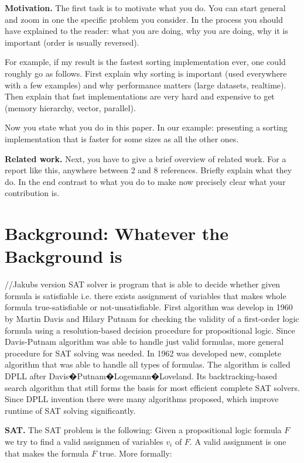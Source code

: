 \documentclass[letterpaper]{article}
\newcommand{\mypar}[1]{{\bf #1.}}
\begin{document}
\mypar{Motivation} The first task is to motivate what you do.  You can
start general and zoom in one the specific problem you consider.  In
the process you should have explained to the reader: what you are doing,
why you are doing, why it is important (order is usually reversed).

For example, if my result is the fastest sorting implementation ever, one
could roughly go as follows. First explain why sorting is important
(used everywhere with a few examples) and why performance matters (large datasets,
realtime). Then explain that fast implementations are very hard and
expensive to get (memory hierarchy, vector, parallel). 

Now you state what you do in this paper. In our example: 
presenting a sorting implementation that is
faster for some sizes as all the other ones.

\mypar{Related work} Next, you have to give a brief overview of
related work. For a report like this, anywhere between 2 and 8
references. Briefly explain what they do. In the end contrast to what
you do to make now precisely clear what your contribution is.

\section{Background: Whatever the Background is}\label{sec:background}

//Jakubs version
SAT solver is program that is able to decide whether given formula is satisfiable i.e. there exists assignment of variables that makes whole formula true-satisfiable or not-unsatisfiable.
First algorithm was develop in 1960 by Martin Davis and Hilary Putnam for checking the validity of a first-order logic formula using a resolution-based decision procedure for propositional logic.
Since Davis-Putnam algorithm was able to handle just valid formulas, more general procedure for SAT solving was needed. In 1962 was developed new, complete algorithm that was able to handle all types of formulas. The algorithm is called DPLL after Davis�Putnam�Logemann�Loveland. Its  backtracking-based search algorithm that still forms the basis for most efficient complete SAT solvers. Since DPLL invention there were many algorithms proposed, which improve runtime of SAT solving significantly.

\mypar{SAT}
The SAT problem is the following:
Given a propositional logic formula $F$ we try to find a valid assignmen of variables $v_i$ of $F$.
A valid assignment is one that makes the formula $F$ true.
More formally:
\end{document}
